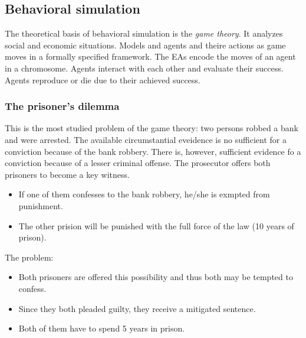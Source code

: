 \documentclass{article}
\begin{document}
\subsection{Behavioral simulation}
The theoretical basis of behavioral simulation is the \textit{game theory}. It analyzes social and
economic situations. Models and agents and theire actions as game moves in a formally specified framework.
\newline\newline
The EAs encode the moves of an agent in a chromosome. Agents interact with each other and evaluate
their success. Agents reproduce or die due to their achieved success.

\subsubsection{The prisoner's dilemma}
This is the most studied problem of the game theory: two persons robbed a bank and were arrested. The
available circumstantial eveidence is no sufficient for a conviction because of the bank robbery. There
is, however, sufficient evidence fo a conviction because of a lesser criminal offense. The prosecutor
offers both prisoners to become a key witness.
\begin{itemize}
    \item If one of them confesses to the bank robbery, he/she is exmpted from punishment.
    \item The other prision will be punished with the full force of the law (10 years of prison).
\end{itemize}
The problem:
\begin{itemize}
    \item Both prisoners are offered this possibility and thus both may be tempted to confess.
    \item Since they both pleaded guilty, they receive a mitigated sentence.
    \item Both of them have to spend 5 years in prison.
\end{itemize}
\end{document}
